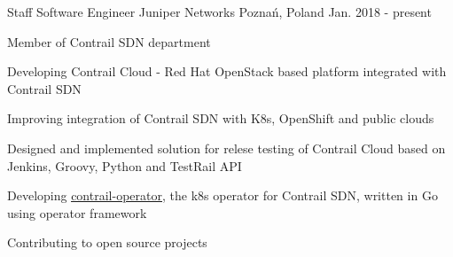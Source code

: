
\begin{cventries}

  \cventry
    {Staff Software Engineer} %
    {Juniper Networks} %
    {Poznań, Poland} %
    {Jan. 2018 - present} %
    {
      \begin{cvitems} %
        \item {Member of Contrail SDN department}
        \item {Developing Contrail Cloud - Red Hat OpenStack based platform integrated with Contrail SDN }
        \item {Improving integration of Contrail SDN with K8s, OpenShift and public clouds}
        \item {Designed and implemented solution for relese testing of Contrail Cloud based on Jenkins, Groovy, Python and TestRail API }
        \item {Developing \underline{\href{https://github.com/Juniper/contrail-operator}{contrail-operator}}, the k8s operator for Contrail SDN, written in Go using operator framework }
        \item {Contributing to open source projects}
      \end{cvitems}
    }



\end{cventries}
